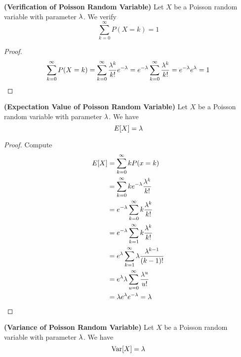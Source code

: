 \documentclass{report}
\begin{document}
\begin{theorem}
\textbf{(Verification of Poisson Random Variable)} Let $X$ be a Poisson random variable with parameter $\lambda $. We verify
\begin{equation}
\sum_{k=0}^\infty P(X=k)=1
\end{equation}
\end{theorem}
\begin{proof}
\begin{equation}
\sum _{k=0}^{\infty}P(X=k)= \sum_{k=0}^{\infty}\frac{\lambda ^k}{k!}e^{-\lambda }=e^{-\lambda }\sum _{k=0}^{\infty}\frac{\lambda ^k}{k!}=e^{-\lambda }e^{\lambda }=1
\end{equation}
\end{proof}
\begin{theorem}
\textbf{(Expectation Value of Poisson Random Variable)} Let $X$ be a Poisson random variable with parameter $\lambda $. We have
\begin{equation}
E[X]=\lambda 
\end{equation}
\end{theorem}
\begin{proof}
Compute
\begin{align}
E[X]&=\sum_{k=0}^\infty kP(x=k)\\
&=\sum_{k=0}^\infty ke^{-\lambda }\frac{\lambda ^k}{k!}\\
&=e^{-\lambda }\sum_{k=0}^\infty k \frac{\lambda ^k}{k!}\\
&=e^{-\lambda}\sum_{k=1}^\infty k\frac{\lambda ^k}{k!}\\
&=e^{\lambda }\sum_{k=1}^\infty \lambda  \frac{\lambda ^{k-1}}{(k-1)!}\\
&=e^{\lambda }\lambda\sum_{u=0}^\infty \frac{\lambda ^u}{u! }\\
&=\lambda e^{\lambda }e^{-\lambda }=\lambda 
\end{align}
\end{proof}
\begin{theorem}
\textbf{(Variance of Poisson Random Variable)} Let $X$ be a Poisson random variable with parameter $\lambda $. We have
\begin{equation}
\text{Var} [X]=\lambda 
\end{equation}
\end{theorem}
\end{document}
